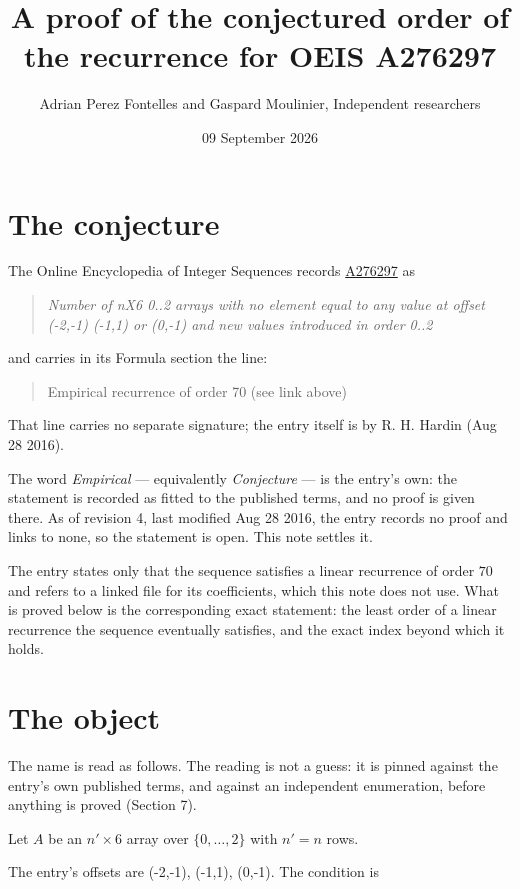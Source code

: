 \documentclass[11pt]{article}
\title{A proof of the conjectured order of the recurrence for OEIS A276297}
\author{Adrian Perez Fontelles and Gaspard Moulinier, Independent researchers}
\date{09 September 2026}
\theoremstyle{definition}
\begin{document}
\maketitle
\section{The conjecture}

The Online Encyclopedia of Integer Sequences records \href{https://oeis.org/A276297}{A276297} as

\begin{quote}\itshape Number of nX6 0..2 arrays with no element equal to any value at offset (-2,-1) (-1,1) or (0,-1) and new values introduced in order 0..2\end{quote}

and carries in its Formula section the line:

\begin{quote}\ttfamily Empirical recurrence of order 70 (see link above)\end{quote}

That line carries no separate signature; the entry itself is by R. H. Hardin (Aug 28 2016).

The word {\itshape Empirical} --- equivalently {\itshape Conjecture} --- is the entry's own: the statement is recorded as fitted to the published terms, and no proof is given there. As of revision 4, last modified Aug 28 2016, the entry records no proof and links to none, so the statement is open. This note settles it.

The entry states only that the sequence satisfies a linear recurrence of order $70$ and refers to a linked file for its coefficients, which this note does not use. What is proved below is the corresponding exact statement: the least order of a linear recurrence the sequence eventually satisfies, and the exact index beyond which it holds.

\section{The object}

The name is read as follows. The reading is not a guess: it is pinned against the entry's own published terms, and against an independent enumeration, before anything is proved (Section 7).

Let $A$ be an $n' \times 6$ array over $\{0,\dots,2\}$ with $n' = n$ rows.

The entry's offsets are (-2,-1), (-1,1), (0,-1). The condition is
\end{document}
